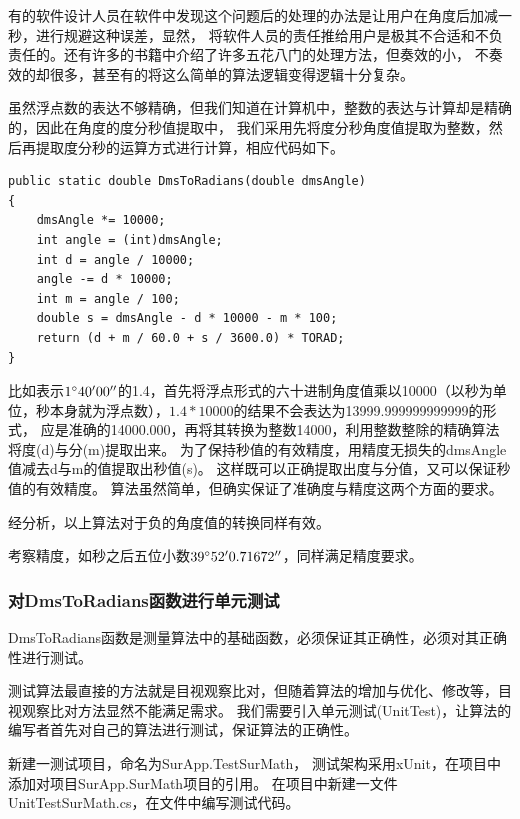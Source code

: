  有的软件设计人员在软件中发现这个问题后的处理的办法是让用户在角度后加减一秒，进行规避这种误差，显然，
 将软件人员的责任推给用户是极其不合适和不负责任的。还有许多的书籍中介绍了许多五花八门的处理方法，但奏效的小，
 不奏效的却很多，甚至有的将这么简单的算法逻辑变得逻辑十分复杂。
 
 虽然浮点数的表达不够精确，但我们知道在计算机中，整数的表达与计算却是精确的，因此在角度的度分秒值提取中，
 我们采用先将度分秒角度值提取为整数，然后再提取度分秒的运算方式进行计算，相应代码如下。
 
\begin{lstlisting}
public static double DmsToRadians(double dmsAngle)
{
    dmsAngle *= 10000; 
    int angle = (int)dmsAngle;
    int d = angle / 10000;
    angle -= d * 10000;
    int m = angle / 100;
    double s = dmsAngle - d * 10000 - m * 100;
    return (d + m / 60.0 + s / 3600.0) * TORAD;
}
\end{lstlisting}

比如表示$1^\circ 40'00''$的1.4，首先将浮点形式的六十进制角度值乘以10000（以秒为单位，秒本身就为浮点数），$1.4*10000$的结果不会表达为13999.999999999999的形式，
应是准确的14000.000，再将其转换为整数14000，利用整数整除的精确算法将度(d)与分(m)提取出来。
为了保持秒值的有效精度，用精度无损失的dmsAngle值减去d与m的值提取出秒值(s)。
 这样既可以正确提取出度与分值，又可以保证秒值的有效精度。
算法虽然简单，但确实保证了准确度与精度这两个方面的要求。

 经分析，以上算法对于负的角度值的转换同样有效。

 考察精度，如秒之后五位小数$39^\circ 52'0.71672''$，同样满足精度要求。




\subsubsection{对DmsToRadians函数进行单元测试}

DmsToRadians函数是测量算法中的基础函数，必须保证其正确性，必须对其正确性进行测试。

测试算法最直接的方法就是目视观察比对，但随着算法的增加与优化、修改等，目视观察比对方法显然不能满足需求。
我们需要引入单元测试(UnitTest)，让算法的编写者首先对自己的算法进行测试，保证算法的正确性。

新建一测试项目，命名为SurApp.TestSurMath， 测试架构采用xUnit，在项目中添加对项目SurApp.SurMath项目的引用。
在项目中新建一文件UnitTestSurMath.cs，在文件中编写测试代码。

